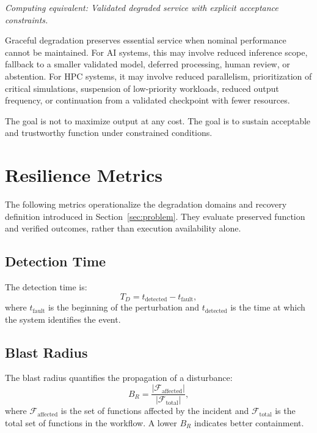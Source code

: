 \documentclass[conference]{IEEEtran}
\begin{document}
\emph{Computing equivalent: Validated degraded service with explicit acceptance constraints.}

Graceful degradation preserves essential service when nominal performance cannot be maintained. For AI systems, this may involve reduced inference scope, fallback to a smaller validated model, deferred processing, human review, or abstention. For HPC systems, it may involve reduced parallelism, prioritization of critical simulations, suspension of low-priority workloads, reduced output frequency, or continuation from a validated checkpoint with fewer resources.

The goal is not to maximize output at any cost. The goal is to sustain acceptable and trustworthy function under constrained conditions.

\section{Resilience Metrics}
\label{sec:metrics}

The following metrics operationalize the degradation domains and recovery definition introduced in Section~\ref{sec:problem}. They evaluate preserved function and verified outcomes, rather than execution availability alone.

\subsection{Detection Time}

The detection time is:
\begin{equation}
T_D = t_{\mathrm{detected}} - t_{\mathrm{fault}},
\end{equation}
where $t_{\mathrm{fault}}$ is the beginning of the perturbation and $t_{\mathrm{detected}}$ is the time at which the system identifies the event.

\subsection{Blast Radius}

The blast radius quantifies the propagation of a disturbance:
\begin{equation}
B_R = \frac{|\mathcal{F}_{\mathrm{affected}}|}{|\mathcal{F}_{\mathrm{total}}|},
\end{equation}
where $\mathcal{F}_{\mathrm{affected}}$ is the set of functions affected by the incident and $\mathcal{F}_{\mathrm{total}}$ is the total set of functions in the workflow. A lower $B_R$ indicates better containment.
\end{document}
